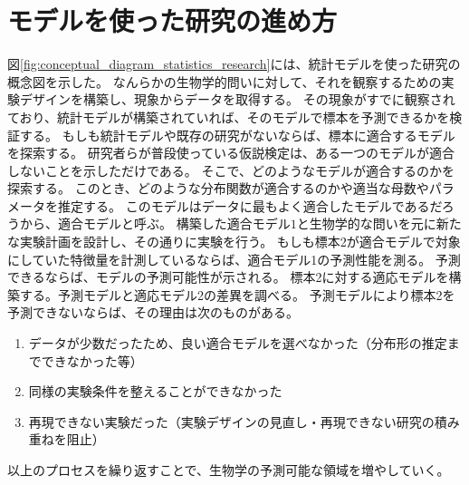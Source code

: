 \chapter{モデルを使った研究の進め方}

図\ref{fig:conceptual_diagram_statistics_research}には、統計モデルを使った研究の概念図を示した。
なんらかの生物学的問いに対して、それを観察するための実験デザインを構築し、現象からデータを取得する。
その現象がすでに観察されており、統計モデルが構築されていれば、そのモデルで標本を予測できるかを検証する。
もしも統計モデルや既存の研究がないならば、標本に適合するモデルを探索する。
研究者らが普段使っている仮説検定は、ある一つのモデルが適合しないことを示しただけである。
そこで、どのようなモデルが適合するのかを探索する。
このとき、どのような分布関数が適合するのかや適当な母数やパラメータを推定する。
このモデルはデータに最もよく適合したモデルであるだろうから、適合モデルと呼ぶ。
構築した適合モデル$1$と生物学的な問いを元に新たな実験計画を設計し、その通りに実験を行う。
もしも標本2が適合モデルで対象にしていた特徴量を計測しているならば、適合モデル1の予測性能を測る。
予測できるならば、モデルの予測可能性が示される。
標本2に対する適応モデルを構築する。予測モデルと適応モデル2の差異を調べる。
予測モデルにより標本2を予測できないならば、その理由は次のものがある。
\begin{enumerate}
    \item データが少数だったため、良い適合モデルを選べなかった（分布形の推定までできなかった等）
    \item 同様の実験条件を整えることができなかった
    \item 再現できない実験だった（実験デザインの見直し・再現できない研究の積み重ねを阻止）
\end{enumerate}

以上のプロセスを繰り返すことで、生物学の予測可能な領域を増やしていく。


